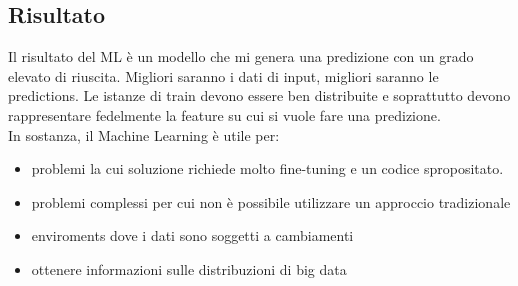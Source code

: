 \subsection{Risultato}
Il risultato del ML è un modello che mi genera una predizione con un grado elevato di riuscita. Migliori saranno i dati di input, migliori saranno le predictions. Le istanze di train devono essere ben distribuite e soprattutto devono rappresentare fedelmente la feature su cui si vuole fare una predizione. 
\\
In sostanza, il Machine Learning è utile per:
\begin{itemize}
    \item problemi la cui soluzione richiede molto fine-tuning e un codice spropositato. 
    \item problemi complessi per cui non è possibile utilizzare un approccio tradizionale
    \item enviroments dove i dati sono soggetti a cambiamenti
    \item ottenere informazioni sulle distribuzioni di big data
\end{itemize}

